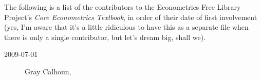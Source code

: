 

\noindent%
The following is a list of the contributors to the Econometrics Free
Library Project's \textit{Core Econometrics Textbook}, in order of
their date of first involvement (yes, I'm aware that it's a little
ridiculous to have this as a separate file when there is only a single
contributor, but let's dream big, shall we).

\begin{description}
\item[2009-07-01] Gray Calhoun, 
\end{description}

